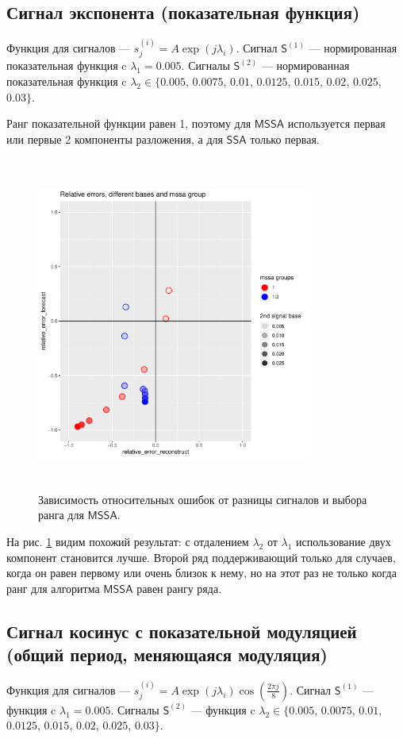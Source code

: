 \documentclass[specialist, substylefile = spbureport.rtx,
    subf,href,colorlinks=true, 12pt]{disser}
\newcommand{\sfS}{\mathsf{S}}
\newcommand{\SSA}{\mathsf{SSA}}
\newcommand{\MSSA}{\mathsf{MSSA}}
\begin{document}
    \subsection{Сигнал экспонента (показательная функция)}
        Функция для сигналов --- $s^{(i)}_j = A \exp(j\lambda_i)$.
        Сигнал $\sfS^{(1)}$ --- нормированная показательная функция c $\lambda_1 = 0.005$.
        Сигналы $\sfS^{(2)}$ --- нормированная показательная функция c $\lambda_2 \in \{0.005$, $0.0075$, $0.01$, $0.0125$, $0.015$, $0.02$, $0.025$, $0.03\}$.

        Ранг показательной функции равен 1, поэтому для $\MSSA$ используется первая или первые 2 компоненты разложения, а для $\SSA$ только первая.

        \begin{figure}[h]
            \centering
            \includegraphics[height=11cm, width=0.8\textwidth]{experiment_1_exp.pdf}
            \caption{Зависимость относительных ошибок от разницы сигналов и выбора ранга для $\MSSA$.}
            \label{fig:exp1_exp}
        \end{figure}

        На рис. \ref{fig:exp1_exp} видим похожий результат: с отдалением $\lambda_2$ от $\lambda_1$ использование двух компонент становится лучше. Второй ряд поддерживающий только для случаев, когда он равен первому или очень близок к нему, но на этот раз не только когда ранг для алгоритма $\MSSA$ равен рангу ряда.

    \subsection{Сигнал косинус с показательной модуляцией (общий период, меняющаяся модуляция)}
        Функция для сигналов --- $s^{(i)}_j = A \exp(j\lambda_i) \cos(\frac{2\pi j}{8})$.
        Сигнал $\sfS^{(1)}$ --- функция c $\lambda_1 = 0.005$.
        Сигналы $\sfS^{(2)}$ --- функция c $\lambda_2 \in \{0.005$, $0.0075$, $0.01$, $0.0125$, $0.015$, $0.02$, $0.025$, $0.03\}$.
\end{document}
